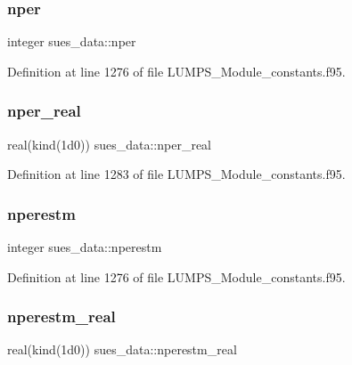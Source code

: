 \mbox{\label{namespacesues__data_aee4c8e6d4c94a2af0599fb1cd40f51ed}} 
\subsubsection{\texorpdfstring{nper}{nper}}
{\footnotesize\ttfamily integer sues\+\_\+data\+::nper}



Definition at line 1276 of file L\+U\+M\+P\+S\+\_\+\+Module\+\_\+constants.\+f95.

\mbox{\label{namespacesues__data_a130a64aeadd8ca145f5ec2d1416174f5}} 
\subsubsection{\texorpdfstring{nper\+\_\+real}{nper\_real}}
{\footnotesize\ttfamily real(kind(1d0)) sues\+\_\+data\+::nper\+\_\+real}



Definition at line 1283 of file L\+U\+M\+P\+S\+\_\+\+Module\+\_\+constants.\+f95.

\mbox{\label{namespacesues__data_a699b9583b9326461b9220d76056b85b5}} 
\subsubsection{\texorpdfstring{nperestm}{nperestm}}
{\footnotesize\ttfamily integer sues\+\_\+data\+::nperestm}



Definition at line 1276 of file L\+U\+M\+P\+S\+\_\+\+Module\+\_\+constants.\+f95.

\mbox{\label{namespacesues__data_aad88365e0d1f6430e9ac39dd331048c1}} 
\subsubsection{\texorpdfstring{nperestm\+\_\+real}{nperestm\_real}}
{\footnotesize\ttfamily real(kind(1d0)) sues\+\_\+data\+::nperestm\+\_\+real}




